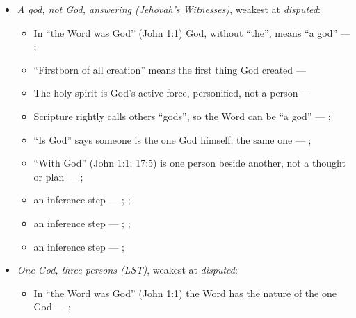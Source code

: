 \documentclass[11pt,paper=\testimonypaper,DIV=13,parskip=false]{scrartcl}
\begin{document}
\begin{itemize}
\item \emph{A god, not God, answering (Jehovah’s Witnesses)}, weakest at \emph{disputed}:
\begin{itemize}
\item In “the Word was God” (John 1:1) God, without “the”, means “a god” --- \cite[27]{watchtower-should-you-believe-trinity-1989}; \cite{new-world-translation-2013}
\item “Firstborn of all creation” means the first thing God created --- \cite[14]{watchtower-should-you-believe-trinity-1989}
\item The holy spirit is God’s active force, personified, not a person --- \cite[20--23]{watchtower-should-you-believe-trinity-1989}
\item Scripture rightly calls others “gods”, so the Word can be “a god” --- \cite[28]{watchtower-should-you-believe-trinity-1989}; \cite[31]{watchtower-questions-from-readers-1986}
\item “Is God” says someone is the one God himself, the same one --- \cite[ch. 8, Are Jesus and the Father One in Purpose Only?]{bernard-oneness-of-god-1983}; \cite[27]{watchtower-should-you-believe-trinity-1989}
\item “With God” (John 1:1; 17:5) is one person beside another, not a thought or plan --- \cite[3, The Triune God]{kibbey-living-systematic-theology-2026}; \cite[27]{watchtower-should-you-believe-trinity-1989}
\item an inference step --- \cite[28]{watchtower-should-you-believe-trinity-1989}; \cite[31]{watchtower-questions-from-readers-1986}; \cite[Origen, Against Celsus V.39]{roberts-ante-nicene-fathers-4-1885}
\item an inference step --- \cite[ch. 8, Are Jesus and the Father One in Purpose Only?]{bernard-oneness-of-god-1983}; \cite[27]{watchtower-should-you-believe-trinity-1989}; \cite[I, q. 28, a. 3]{aquinas-summa-1920}
\item an inference step --- \cite[23]{watchtower-should-you-believe-trinity-1989}; \cite[122--123]{roberts-christendom-astray}
\end{itemize}
\item \emph{One God, three persons (LST)}, weakest at \emph{disputed}:
\begin{itemize}
\item In “the Word was God” (John 1:1) the Word has the nature of the one God --- \cite{harner-qualitative-anarthrous-1973}; \cite[3, The Triune God]{kibbey-living-systematic-theology-2026}

\end{itemize}
\end{itemize}
\end{document}

